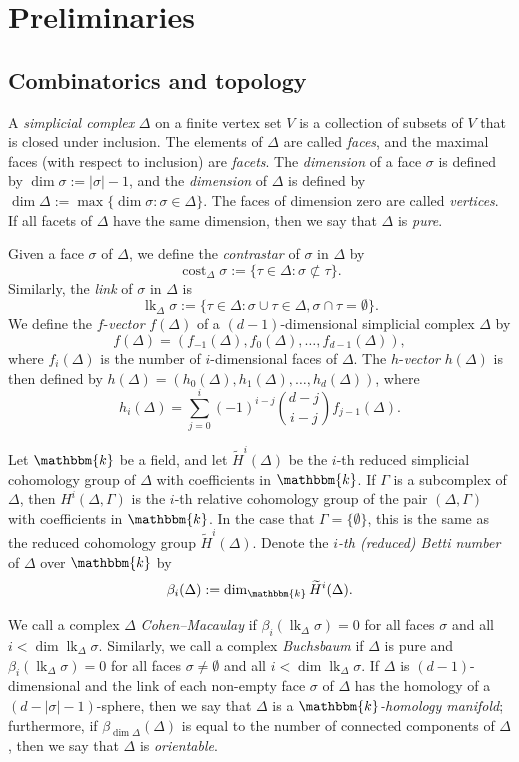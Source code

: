 \documentclass[10pt]{amsart}
\theoremstyle{definition}
\DeclareMathOperator\lk{lk}
\DeclareMathOperator\cost{cost}
\newcommand{\field}{\mathbbm{k}}
\begin{document}
\section{Preliminaries} \label{sect:preliminaries}

\subsection{Combinatorics and topology}\label{subsect:topo}

A \emph{simplicial complex} $\Delta$ on a finite vertex set $V$ is a collection of subsets of $V$ that is closed under inclusion. The elements of $\Delta$ are called \emph{faces}, and the maximal faces (with respect to inclusion) are \emph{facets}. The \emph{dimension} of a face $\sigma$ is defined by $\dim \sigma :=|\sigma|-1$, and the \emph{dimension} of $\Delta$ is defined by $\dim \Delta := \max\{\dim \sigma: \sigma\in \Delta\}$. The faces of dimension zero are called \emph{vertices}. If all facets of $\Delta$ have the same dimension, then we say that $\Delta$ is \emph{pure}.

Given a face $\sigma$ of $\Delta$, we define the \emph{contrastar} of $\sigma$ in $\Delta$ by
\[
\cost_\Delta \sigma := \{\tau\in \Delta: \sigma\not\subset\tau\}.
\]
Similarly, the \emph{link} of $\sigma$ in $\Delta$ is
\[
\lk_\Delta \sigma := \{\tau\in \Delta: \sigma\cup \tau \in \Delta, \sigma\cap \tau = \emptyset\}.
\]
We define the $f$-\emph{vector} $f(\Delta)$ of a $(d-1)$-dimensional simplicial complex $\Delta$ by
\[
f(\Delta)=(f_{-1}(\Delta), f_0(\Delta), \ldots, f_{d-1}(\Delta)),
\]
where $f_i(\Delta)$ is the number of $i$-dimensional faces of $\Delta$. The $h$-\emph{vector} $h(\Delta)$ is then defined by $h(\Delta)=(h_0(\Delta), h_1(\Delta), \ldots, h_d(\Delta))$, where
\[
h_i(\Delta)=\sum_{j=0}^i(-1)^{i-j}\binom{d-j}{i-j}f_{j-1}(\Delta).
\]


Let $\field$ be a field, and let $\tilde{H}^i(\Delta)$ be the $i$-th reduced simplicial cohomology group of $\Delta$ with coefficients in $\field$. If $\Gamma$ is a subcomplex of $\Delta$, then $H^i(\Delta, \Gamma)$ is the $i$-th relative cohomology group of the pair $(\Delta, \Gamma)$ with coefficients in $\field$. In the case that $\Gamma=\{\emptyset\}$, this is the same as the reduced cohomology group $\tilde{H}^i(\Delta)$. Denote the $i$\emph{-th (reduced) Betti number} of $\Delta$ over $\field$ by
\[
\beta_i(\Delta):=\dim_\field \widetilde{H}^i(\Delta).
\]

We call a complex $\Delta$ \emph{Cohen--Macaulay} if $\beta_i(\lk_\Delta \sigma)=0$ for all faces $\sigma$ and all $i<\dim \lk_\Delta \sigma$. Similarly, we call a complex \emph{Buchsbaum} if $\Delta$ is pure and $\beta_i(\lk_\Delta \sigma)=0$ for all faces $\sigma\not=\emptyset$ and all $i<\dim \lk_\Delta \sigma$. If $\Delta$ is $(d-1)$-dimensional and the link of each non-empty face $\sigma$ of $\Delta$ has the homology of a $(d-|\sigma|-1)$-sphere, then we say that $\Delta$ is a $\field$\emph{-homology manifold}; furthermore, if $\beta_{\dim\Delta}(\Delta)$ is equal to the number of connected components of $\Delta$, then we say that $\Delta$ is \emph{orientable}.
\end{document}
